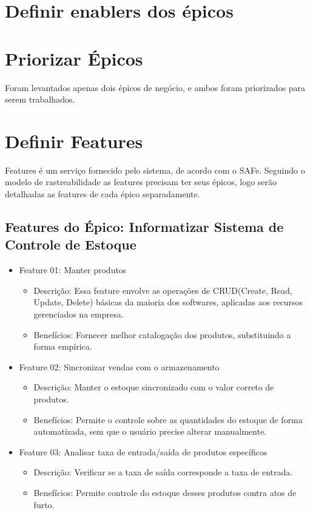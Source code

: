 \section{Definir enablers dos épicos}

\section{Priorizar Épicos}
Foram levantados apenas dois épicos de negócio, e ambos foram priorizados para serem trabalhados.

\section{Definir Features}
Features é um serviço fornecido pelo sistema, de acordo com o SAFe. Seguindo o modelo de rastreabilidade as features precisam ter seus épicos, logo serão detalhadas as features de cada épico separadamente.

\subsection{Features do Épico: Informatizar Sistema de Controle de Estoque}

\begin{itemize}
\item Feature 01: Manter produtos
\begin{itemize}
\item Descrição: Essa feature envolve as operações de CRUD(Create, Read, Update, Delete) básicas da maioria dos softwares, aplicadas aos recursos gerenciados na empresa.
\item Benefícios: Fornecer melhor catalogação dos produtos, substituindo a forma empírica.
\end{itemize}

\item Feature 02: Sincronizar vendas com o armazenamento
\begin{itemize}
    \item Descrição: Manter o estoque sincronizado com o valor correto de produtos.
    \item Benefícios: Permite o controle sobre as quantidades do estoque de forma automatizada, sem que o usuário precise alterar manualmente.
\end{itemize}


\item Feature 03: Analisar taxa de entrada/saída de produtos específicos
\begin{itemize}
	\item Descrição: Verificar se a taxa de saída corresponde a taxa de entrada.
	\item Benefícios: Permite controle do estoque desses produtos contra atos de furto.
\end{itemize}

\end{itemize}

